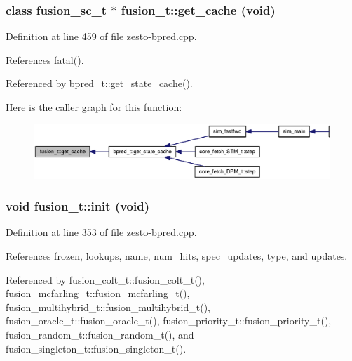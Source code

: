 \subsubsection[{get\_\-cache}]{\setlength{\rightskip}{0pt plus 5cm}class {\bf fusion\_\-sc\_\-t} $\ast$ fusion\_\-t::get\_\-cache (void)\hspace{0.3cm}{\tt  [virtual]}}\label{classfusion__t_5d98c1e50bf6003e7d73d5a9fd603736}




Definition at line 459 of file zesto-bpred.cpp.

References fatal().

Referenced by bpred\_\-t::get\_\-state\_\-cache().

Here is the caller graph for this function:\nopagebreak
\begin{figure}[H]
\begin{center}
\leavevmode
\includegraphics[width=317pt]{classfusion__t_5d98c1e50bf6003e7d73d5a9fd603736_icgraph}
\end{center}
\end{figure}
\subsubsection[{init}]{\setlength{\rightskip}{0pt plus 5cm}void fusion\_\-t::init (void)\hspace{0.3cm}{\tt  [protected]}}\label{classfusion__t_65608af086c04e3ce10acf9c3bcbe8de}




Definition at line 353 of file zesto-bpred.cpp.

References frozen, lookups, name, num\_\-hits, spec\_\-updates, type, and updates.

Referenced by fusion\_\-colt\_\-t::fusion\_\-colt\_\-t(), fusion\_\-mcfarling\_\-t::fusion\_\-mcfarling\_\-t(), fusion\_\-multihybrid\_\-t::fusion\_\-multihybrid\_\-t(), fusion\_\-oracle\_\-t::fusion\_\-oracle\_\-t(), fusion\_\-priority\_\-t::fusion\_\-priority\_\-t(), fusion\_\-random\_\-t::fusion\_\-random\_\-t(), and fusion\_\-singleton\_\-t::fusion\_\-singleton\_\-t().


